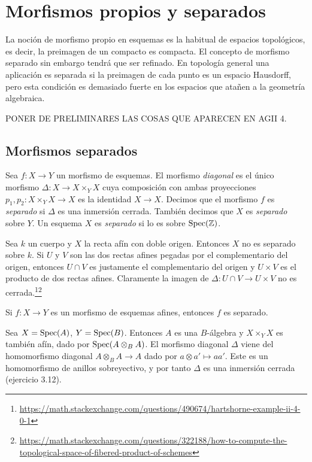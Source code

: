 \documentclass[GA.tex]{subfiles}
\begin{document}

\chapter{Morfismos propios y separados}

La noción de morfismo propio en esquemas es la habitual de espacios topológicos, es decir, la preimagen de un compacto es compacta. El concepto de morfismo separado sin embargo tendrá que ser refinado. En topología general una aplicación es separada si la preimagen de cada punto es un espacio Hausdorff, pero esta condición es demasiado fuerte en los espacios que atañen a la geometría algebraica. 


PONER DE PRELIMINARES LAS COSAS QUE APARECEN EN AGII 4. 
\section{Morfismos separados}


\begin{defi}
Sea $f:X\to Y$ un morfismo de esquemas. El morfismo \emph{diagonal} es el único morfismo $\Delta:X\to X\times_Y X$ cuya composición con ambas proyecciones $p_1,p_2:X\times_Y X\to X$ es la identidad $X\to X$. Decimos que el morfismo $f$ es \emph{separado} si $\Delta$ es una inmersión cerrada. También decimos que $X$ es \emph{separado} sobre $Y$. Un esquema $X$ es \emph{separado} si lo es sobre $\operatorname{Spec}(\mathbb{Z})$.  
\end{defi}

\begin{ej}
Sea $k$ un cuerpo y $X$ la recta afín con doble origen. Entonces $X$ no es separado sobre $k$. Si $U$ y $V$ son las dos rectas afines pegadas por el complementario del origen, entonces $U\cap V$ es justamente el complementario del origen y $U\times V$ es el producto de dos rectas afines. Claramente la imagen de $\Delta:U\cap V\to U\times V$ no es cerrada.\footnote{\url{https://math.stackexchange.com/questions/490674/hartshorne-example-ii-4-0-1}}\footnote{\url{https://math.stackexchange.com/questions/322188/how-to-compute-the-topological-space-of-fibered-product-of-schemes}}
\end{ej}

\begin{prop}
Si $f:X\to Y$ es un morfismo de esquemas afines, entonces $f$ es separado.
\end{prop}
\begin{dem}
Sea $X=\operatorname{Spec}(A)$, $Y=\operatorname{Spec}(B)$. Entonces $A$ es una $B$-álgebra y $X\times_Y X$ es también afín, dado por $\operatorname{Spec}(A\otimes_B A)$. El morfismo diagonal $\Delta$ viene del homomorfismo diagonal $A\otimes_B A\to A$ dado por $a\otimes a'\mapsto aa'$. Este es un homomorfismo de anillos sobreyectivo, y por tanto $\Delta$ es una inmersión cerrada (ejercicio 3.12).
\end{dem}
\end{document}
